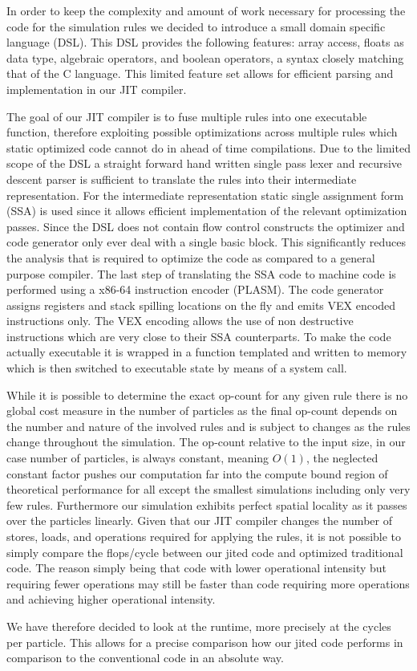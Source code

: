 In order to keep the complexity and amount of work necessary for processing the code for the simulation rules we decided to introduce a small domain specific language (DSL). This DSL provides the following features: array access, floats as data type, algebraic operators, and boolean operators, a syntax closely matching that of the C language. This limited feature set allows for efficient parsing and implementation in our JIT compiler.

The goal of our JIT compiler is to fuse multiple rules into one executable function, therefore exploiting possible optimizations across multiple rules which static optimized code cannot do in ahead of time compilations. Due to the limited scope of the DSL a straight forward hand written single pass lexer and recursive descent parser is sufficient to translate the rules into their intermediate representation. For the intermediate representation static single assignment form (SSA) is used since it allows efficient implementation of the relevant optimization passes. Since the DSL does not contain flow control constructs the optimizer and code generator only ever deal with a single basic block. This significantly reduces the analysis that is required to optimize the code as compared to a general purpose compiler. The last step of translating the SSA code to machine code is performed using a x86-64 instruction encoder (PLASM). The code generator assigns registers and stack spilling locations on the fly and emits VEX encoded instructions only. The VEX encoding allows the use of non destructive instructions which are very close to their SSA counterparts. To make the code actually executable it is wrapped in a function templated and written to memory which is then switched to executable state by means of a system call.


While it is possible to determine the exact op-count for any given rule there is no global cost measure in the number of particles as the final op-count depends on the number and nature of the involved rules and is subject to changes as the rules change throughout the simulation. The op-count relative to the input size, in our case number of particles, is always constant, meaning $O(1)$, the neglected constant factor pushes our computation far into the compute bound region of theoretical performance for all except the smallest simulations including only very few rules. Furthermore our simulation exhibits perfect spatial locality as it passes over the particles linearly.
Given that our JIT compiler changes the number of stores, loads, and operations required for applying the rules, it is not possible to simply compare the flops/cycle between our jited code and optimized traditional code. The reason simply being that code with lower operational intensity but requiring fewer operations may still be faster than code requiring more operations and achieving higher operational intensity.

We have therefore decided to look at the runtime, more precisely at the cycles per particle. This allows for a precise comparison how our jited code performs in comparison to the conventional code in an absolute way.
